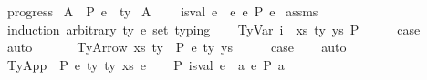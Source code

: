 \begin{isabellebody}
\ progress{\isacharcolon}{\kern0pt}\isanewline
{}\ A{}{\isacharcolon}{\kern0pt}\ {\isachardoublequoteopen}{\isasymGamma}\ {\isasymturnstile}{\isacharbraceleft}{\kern0pt}P{\isacharbraceright}{\kern0pt}\ e\ {\isacharcolon}{\kern0pt}\ ty{\isachardoublequoteclose}\isanewline
{}\ A{}{\isacharcolon}{\kern0pt}\ {\isachardoublequoteopen}{\isasymGamma}\ {\isacharequal}{\kern0pt}\ {\isacharbrackleft}{\kern0pt}{\isacharbrackright}{\kern0pt}{\isachardoublequoteclose}\isanewline
{}\ {\isachardoublequoteopen}is{\isacharunderscore}{\kern0pt}val\ e\ {\isasymor}\ {\isacharparenleft}{\kern0pt}{\isasymexists}e{\isacharprime}{\kern0pt}{\isachardot}{\kern0pt}\ e\ {\isacharminus}{\kern0pt}{\isachargreater}{\kern0pt}{\isacharbraceleft}{\kern0pt}P{\isacharbraceright}{\kern0pt}\ e{\isacharprime}{\kern0pt}{\isacharparenright}{\kern0pt}{\isachardoublequoteclose}\isanewline
%
\isadelimproof
%
\endisadelimproof
%
\isatagproof
{}\isamarkupfalse%
\ assms\isanewline
{}\isamarkupfalse%
\ {\isacharparenleft}{\kern0pt}induction\ arbitrary{\isacharcolon}{\kern0pt}\ ty\ e{\isacharprime}{\kern0pt}\ set{\isacharcolon}{\kern0pt}\ typing{\isacharparenright}{\kern0pt}\isanewline
\ \ \isamarkupfalse%
\ {\isacharparenleft}{\kern0pt}TyVar\ i\ {\isasymGamma}\ xs\ ty\ ys\ P{\isacharparenright}{\kern0pt}\isanewline
\ \ \isamarkupfalse%
\ \isamarkupfalse%
\ {\isacharquery}{\kern0pt}case\isanewline
\ \ \isamarkupfalse%
\ auto\isanewline
\ \ \isamarkupfalse%
\isanewline
{}\isamarkupfalse%
\isanewline
\ \ \isamarkupfalse%
\ {\isacharparenleft}{\kern0pt}TyArrow\ xs\ ty{}\ {\isasymGamma}\ P\ e\ ty{}\ ys{\isacharparenright}{\kern0pt}\isanewline
\ \ \isamarkupfalse%
\ \isamarkupfalse%
\ {\isacharquery}{\kern0pt}case\isanewline
\ \ \isamarkupfalse%
\ auto\isanewline
\ \ \isamarkupfalse%
\isanewline
{}\isamarkupfalse%
\isanewline
\ \ \isamarkupfalse%
\ {\isacharparenleft}{\kern0pt}TyApp\ {\isasymGamma}\ P\ e{}\ ty{}\ ty{}\ xs\ e{}{\isacharparenright}{\kern0pt}\isanewline
\ \ \isamarkupfalse%
\ P{}{\isacharcolon}{\kern0pt}\ {\isachardoublequoteopen}is{\isacharunderscore}{\kern0pt}val\ e{}\ {\isasymor}\ {\isacharparenleft}{\kern0pt}{\isasymexists}a{\isachardot}{\kern0pt}\ e{}\ {\isacharminus}{\kern0pt}{\isachargreater}{\kern0pt}{\isacharbraceleft}{\kern0pt}P{\isacharbraceright}{\kern0pt}\ a{\isacharparenright}{\kern0pt}{\isachardoublequoteclose}\isanewline

\end{isabellebody}
